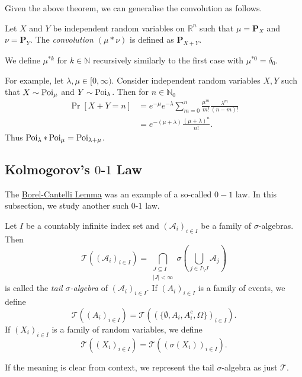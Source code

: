 Given the above theorem, we can generalise the convolution as follows.

\begin{definition}
    Let $X$ and $Y$ be independent random variables on $\mathbb{R}^n$ such that $\mu=\textbf{P}_X$ and $\nu=\textbf{P}_Y$. The \textit{convolution $(\mu * \nu)$} is defined as $\textbf{P}_{X+Y}$.
\end{definition}

We define $\mu^{*k}$ for $k\in\mathbb{N}$ recursively similarly to the first case with $\mu^{*0}=\delta_0$.

\vspace{2mm}
For example, let $\lambda,\mu\in[0,\infty)$. Consider independent random variables $X,Y$ such that $X\sim\operatorname{Poi}_\mu$ and $Y\sim\operatorname{Poi}_\lambda$. Then for $n\in\mathbb{N}_0$
\begin{align*}
    \Pr[X+Y=n] &= e^{-\mu}e^{-\lambda}\sum_{m=0}^n \frac{\mu^m}{m!}\frac{\lambda^m}{(n-m)!} \\
    &= e^{-(\mu+\lambda)}\frac{(\mu+\lambda)^n}{n!}.
\end{align*}
Thus $\operatorname{Poi}_\lambda * \operatorname{Poi}_\mu = \operatorname{Poi}_{\lambda+\mu}$.

\subsection{Kolmogorov's \texorpdfstring{$0$}{TEXT}-\texorpdfstring{$1$}{TEXT} Law}

The \hyperref[borelCantelliLemma]{Borel-Cantelli Lemma} was an example of a so-called $0-1$ law. In this subsection, we study another such $0$-$1$ law.

\begin{definition}
    Let $I$ be a countably infinite index set and $(\mathcal{A}_i)_{i\in I}$ be a family of $\sigma$-algebras. Then
    $$\mathcal{T}((\mathcal{A}_i)_{i\in I})=\bigcap_{\substack{J\subseteq I \\ |J|<\infty}} \sigma\left(\bigcup_{j\in I\setminus J}\mathcal{A}_j\right)$$
    is called the \textit{tail $\sigma$-algebra} of $(\mathcal{A}_i)_{i\in I}$. If $(A_i)_{i\in I}$ is a family of events, we define
    $$\mathcal{T}((A_i)_{i\in I}) = \mathcal{T}((\{\emptyset,A_i,A_i^c,\Omega\})_{i\in I}).$$
    If $(X_i)_{i\in I}$ is a family of random variables, we define
    $$\mathcal{T}((X_i)_{i\in I}) = \mathcal{T}((\sigma(X_i))_{i\in I}).$$
\end{definition}

If the meaning is clear from context, we represent the tail $\sigma$-algebra as just $\mathcal{T}$.

